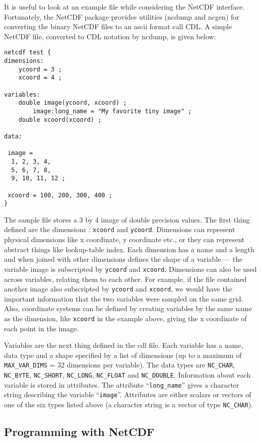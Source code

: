 It is useful to look at an example file while considering the NetCDF
interface. Fortunately, the NetCDF package provides utilities (ncdump
and ncgen) for converting the binary NetCDF files to an ascii format
call CDL. A simple NetCDF file, converted to CDL notation by ncdump,
is given below:

\begin{verbatim}
netcdf test {
dimensions:
	ycoord = 3 ;
	xcoord = 4 ;

variables:
	double image(ycoord, xcoord) ;
		image:long_name = "My favorite tiny image" ;
	double xcoord(xcoord) ;

data:

 image =
  1, 2, 3, 4,
  5, 6, 7, 8,
  9, 10, 11, 12 ;

 xcoord = 100, 200, 300, 400 ;
}
\end{verbatim}

The sample file stores a 3 by 4 image of double precision values. The
first thing defined are the dimensions : \verb+xcoord+ and
\verb+ycoord+. Dimensions can represent physical dimensions like x
coordinate, y coordinate etc., or they can represent abstract things
like lookup-table index.  Each dimension has a name and a length and
when joined with other dimensions defines the shape of a variable ---
the variable image is subscripted by \verb+ycoord+ and \verb+xcoord+.
Dimensions can also be used across variables, relating them to each
other. For example, if the file contained another image also
subscripted by \verb+ycoord+ and \verb+xcoord+, we would have the
important information that the two variables were sampled on the same
grid.  Also, coordinate systems can be defined by creating variables
by the same name as the dimension, like \verb+xcoord+ in the example
above, giving the x coordinate of each point in the image.

Variables are the next thing defined in the cdl file. Each variable
has a name, data type and a shape specified by a list of dimensions
(up to a maximum of \verb+MAX_VAR_DIMS+ = 32 dimensions per variable).
The data types are \verb+NC_CHAR+, \verb+NC_BYTE+, \verb+NC_SHORT+,
\verb+NC_LONG+, \verb+NC_FLOAT+ and \verb+NC_DOUBLE+. Information
about each variable is stored in attributes.  The attribute
``\verb+long_name+'' gives a character string describing the variable
``\verb+image+''. Attributes are either scalars or vectors of one of
the six types listed above (a character string is a vector of type
\verb+NC_CHAR+).

\subsection{Programming with NetCDF}

